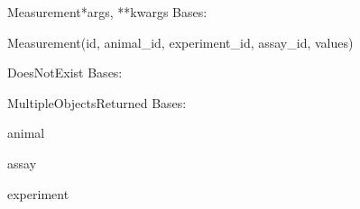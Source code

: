\documentclass[letterpaper,10pt,english]{sphinxmanual}
\begin{document}
\hypertarget{data.models.Measurement}{}\begin{classdesc}{Measurement}{*args, **kwargs}
Bases: 

Measurement(id, animal\_id, experiment\_id, assay\_id, values)

\hypertarget{data.models.Measurement.DoesNotExist}{}\begin{excdesc}{DoesNotExist}
Bases: 
\end{excdesc}

\hypertarget{data.models.Measurement.MultipleObjectsReturned}{}\begin{excdesc}{MultipleObjectsReturned}
Bases: 
\end{excdesc}

\hypertarget{data.models.Measurement.animal}{}\begin{memberdesc}[Measurement]{animal}\end{memberdesc}

\hypertarget{data.models.Measurement.assay}{}\begin{memberdesc}[Measurement]{assay}\end{memberdesc}

\hypertarget{data.models.Measurement.experiment}{}\begin{memberdesc}[Measurement]{experiment}\end{memberdesc}
\end{classdesc}
\end{document}
